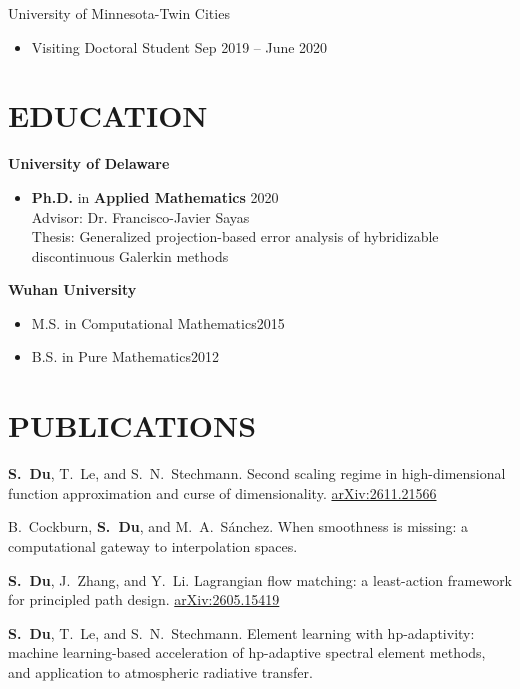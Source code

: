 \documentclass[11pt]{res}
\newenvironment{cvitemize}{\begin{itemize}\itemsep -2pt}{\end{itemize}\vspace{-5pt}}
\newenvironment{cvenumerate}{\begin{etaremune}\itemsep -2pt}{\end{etaremune}\vspace{-5pt}}
\begin{document}
\begin{resume}
University of Minnesota-Twin Cities
\begin{cvitemize}
\item Visiting Doctoral Student 
\hfill Sep 2019 -- June 2020
\end{cvitemize}

\section{EDUCATION}
{\bf University of Delaware}
\begin{cvitemize}
\item {\bf Ph.D.} in {\bf Applied Mathematics}  \hfill 2020\\
Advisor: Dr. Francisco-Javier Sayas\\
Thesis: Generalized projection-based error analysis of hybridizable discontinuous Galerkin methods
\end{cvitemize}

{\bf Wuhan University}
\begin{cvitemize}
\item  M.S. in Computational Mathematics\hfill 2015
\item  B.S. in Pure Mathematics\hfill 2012
\end{cvitemize}



\section{PUBLICATIONS}
\begin{cvenumerate}

\item[]
\hspace{-1cm}{\bf Submitted/preprint}

\item {\bf S.~Du}, T.~Le, and S.~N.~Stechmann. Second scaling regime in high-dimensional function approximation and curse of dimensionality. \href{https://arxiv.org/abs/2611.21566}{arXiv:2611.21566}

\item B.~Cockburn, {\bf S.~Du}, and M.~A.~Sánchez. When smoothness is missing: a computational gateway to interpolation spaces.

\item {\bf S.~Du}, J.~Zhang, and Y.~Li. Lagrangian flow matching: a least-action framework for principled path design. \href{https://arxiv.org/abs/2605.15419}{arXiv:2605.15419}

\item {\bf S.~Du}, T.~Le, and S.~N.~Stechmann. Element learning with hp-adaptivity: machine learning-based acceleration of hp-adaptive spectral element methods, and application to atmospheric radiative transfer.


\end{cvenumerate}
\end{resume}
\end{document}
